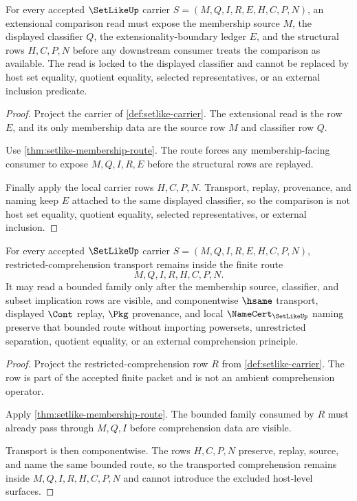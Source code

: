 \begin{theorem}
\label{thm:setlike-extensional-boundary-classifier-lock}
For every accepted $\SetLikeUp$ carrier $S=(M,Q,I,R,E,H,C,P,N)$, an extensional comparison read must expose the membership source $M$, the displayed classifier $Q$, the extensionality-boundary ledger $E$, and the structural rows $H,C,P,N$ before any downstream consumer treats the comparison as available. The read is locked to the displayed classifier and cannot be replaced by host set equality, quotient equality, selected representatives, or an external inclusion predicate.
\end{theorem}
\begin{proof}
Project the carrier of \autoref{def:setlike-carrier}. The extensional read is the row $E$, and its only membership data are the source row $M$ and classifier row $Q$.

Use \autoref{thm:setlike-membership-route}. The route forces any membership-facing consumer to expose $M,Q,I,R,E$ before the structural rows are replayed.

Finally apply the local carrier rows $H,C,P,N$. Transport, replay, provenance, and naming keep $E$ attached to the same displayed classifier, so the comparison is not host set equality, quotient equality, selected representatives, or external inclusion.
\end{proof}

\begin{theorem}
\label{thm:setlike-bounded-comprehension-transport}
For every accepted $\SetLikeUp$ carrier $S=(M,Q,I,R,E,H,C,P,N)$, restricted-comprehension transport remains inside the finite route
$$
M,Q,I,R,H,C,P,N .
$$
It may read a bounded family only after the membership source, classifier, and subset implication rows are visible, and componentwise $\hsame$ transport, displayed $\Cont$ replay, $\Pkg$ provenance, and local $\NameCert_{\SetLikeUp}$ naming preserve that bounded route without importing powersets, unrestricted separation, quotient equality, or an external comprehension principle.
\end{theorem}
\begin{proof}
Project the restricted-comprehension row $R$ from \autoref{def:setlike-carrier}. The row is part of the accepted finite packet and is not an ambient comprehension operator.

Apply \autoref{thm:setlike-membership-route}. The bounded family consumed by $R$ must already pass through $M,Q,I$ before comprehension data are visible.

Transport is then componentwise. The rows $H,C,P,N$ preserve, replay, source, and name the same bounded route, so the transported comprehension remains inside $M,Q,I,R,H,C,P,N$ and cannot introduce the excluded host-level surfaces.
\end{proof}

